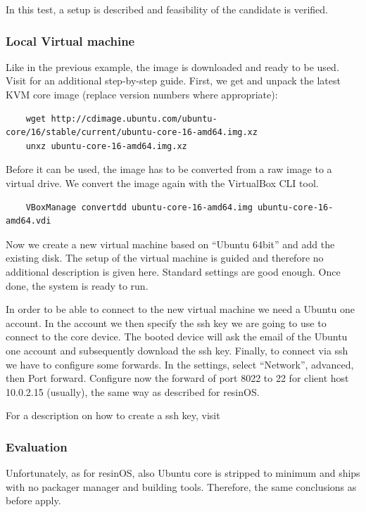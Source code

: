 \documentclass[]{scrartcl}
\begin{document}
In this test, a setup is described and feasibility of the candidate is verified.

\subsubsection{Local Virtual machine}

Like in the previous example, the image is downloaded and ready to be used. Visit \cite{ubuntu01} for an additional step-by-step guide.
First, we get and unpack the latest KVM core image (replace version numbers where appropriate):

\begin{verbatim}
	wget http://cdimage.ubuntu.com/ubuntu-core/16/stable/current/ubuntu-core-16-amd64.img.xz
	unxz ubuntu-core-16-amd64.img.xz
\end{verbatim}

Before it can be used, the image has to be converted from a raw image to a virtual drive. We convert the image again with the VirtualBox CLI tool.

\begin{verbatim}
	VBoxManage convertdd ubuntu-core-16-amd64.img ubuntu-core-16-amd64.vdi
\end{verbatim}

Now we create a new virtual machine based on ``Ubuntu 64bit'' and add the existing disk. The setup of the virtual machine is guided and therefore no additional description is given here. Standard settings are good enough. Once done, the system is ready to run.

In order to be able to connect to the new virtual machine we need a Ubuntu one account. In the account we then specify the ssh key we are going to use to connect to the core device. The booted device will ask the email of the Ubuntu one account and subsequently download the ssh key. 
Finally, to connect via ssh we have to configure some forwards. In the settings, select ``Network'', advanced, then Port forward.
Configure now the forward of port 8022 to 22 for client host 10.0.2.15 (usually), the same way as described for resinOS.

For a description on how to create a ssh key, visit \cite{atlassian01}

\subsubsection{Evaluation}

Unfortunately, as for resinOS, also Ubuntu core is stripped to minimum and ships with no packager manager and building tools. Therefore, the same conclusions as before apply.
\end{document}
